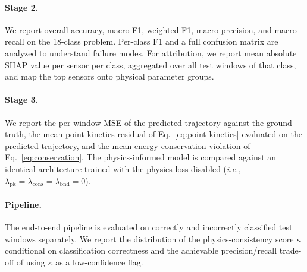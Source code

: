 \paragraph{Stage 2.} We report overall accuracy, macro-F1, weighted-F1, macro-precision, and macro-recall on the 18-class problem. Per-class F1 and a full confusion matrix are analyzed to understand failure modes. For attribution, we report mean absolute SHAP value per sensor per class, aggregated over all test windows of that class, and map the top sensors onto physical parameter groups.

\paragraph{Stage 3.} We report the per-window MSE of the predicted trajectory against the ground truth, the mean point-kinetics residual of Eq.~\eqref{eq:point-kinetics} evaluated on the predicted trajectory, and the mean energy-conservation violation of Eq.~\eqref{eq:conservation}. The physics-informed model is compared against an identical architecture trained with the physics loss disabled (\textit{i.e.,} $\lambda_{\text{pk}} = \lambda_{\text{cons}} = \lambda_{\text{bnd}} = 0$).

\paragraph{Pipeline.} The end-to-end pipeline is evaluated on correctly and incorrectly classified test windows separately. We report the distribution of the physics-consistency score $\kappa$ conditional on classification correctness and the achievable precision/recall trade-off of using $\kappa$ as a low-confidence flag.
